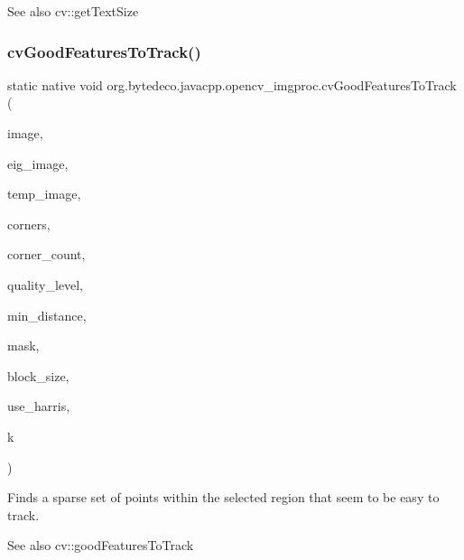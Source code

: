 \begin{DoxySeeAlso}{See also}
cv\+::get\+Text\+Size 
\end{DoxySeeAlso}
\mbox{\label{group__imgproc__c_gafb9a4af821c06260d399dc2163af6727}} 
\subsubsection{\texorpdfstring{cv\+Good\+Features\+To\+Track()}{cvGoodFeaturesToTrack()}}
{\footnotesize\ttfamily static native void org.\+bytedeco.\+javacpp.\+opencv\+\_\+imgproc.\+cv\+Good\+Features\+To\+Track (\begin{DoxyParamCaption}\item[{@Const Cv\+Arr}]{image,  }\item[{Cv\+Arr}]{eig\+\_\+image,  }\item[{Cv\+Arr}]{temp\+\_\+image,  }\item[{Cv\+Point2\+D32f}]{corners,  }\item[{Int\+Pointer}]{corner\+\_\+count,  }\item[{double}]{quality\+\_\+level,  }\item[{double}]{min\+\_\+distance,  }\item[{@Const Cv\+Arr}]{mask,  }\item[{int}]{block\+\_\+size,  }\item[{int}]{use\+\_\+harris,  }\item[{double}]{k }\end{DoxyParamCaption})\hspace{0.3cm}{\ttfamily [static]}}



Finds a sparse set of points within the selected region that seem to be easy to track. 

\begin{DoxySeeAlso}{See also}
cv\+::good\+Features\+To\+Track 
\end{DoxySeeAlso}
\mbox{\label{group__imgproc__c_gadd18438ad841a7150a2ba920d52f2f38}} 
